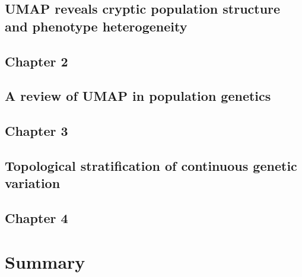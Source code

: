 \documentclass[12pt, TexShade, letterpaper]{report}
\makeatletter
\newcommand{\unchapter}[1]{%
  \begingroup
  \let\@makechapterhead\@gobble %
  \chapter{#1}
  \endgroup
}
\makeatother
\begin{document}
\begin{refsection}
\unchapter{UMAP reveals cryptic population structure and phenotype heterogeneity}
\chapter*{Chapter 2}
\label{chap:chapter2}


\cleardoublepage
{}
\begin{singlespace}
\printbibliography[heading=subbibintoc]
\end{singlespace}
\end{refsection}

\begin{refsection}
\unchapter{A review of UMAP in population genetics}
\chapter*{Chapter 3}
\label{chap:chapter3}


\cleardoublepage
{}
\begin{singlespace}
\printbibliography[heading=subbibintoc]
\end{singlespace}
\end{refsection}

\begin{refsection}
\unchapter{Topological stratification of continuous genetic variation}
\chapter*{Chapter 4}
\label{chap:chapter4}


\cleardoublepage
{}
\begin{singlespace}
\printbibliography[heading=subbibintoc]
\end{singlespace}
\end{refsection}

%
%

\part{Summary}
\label{part:conclusion}
\end{document}
